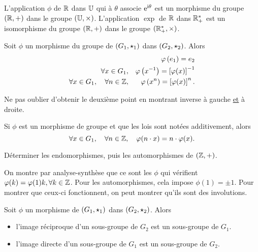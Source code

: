 \documentclass{magnolia}
\begin{document}
\begin{remarqueUnique}
\remarque L'application $\phi$ de $\mathbb{R}$ dans $\U$ qui à $\theta$ associe
  ${\rm e}^{{\rm i}\theta}$ est un morphisme du groupe $(\mathbb{R},+)$ dans le groupe $(\U,\times)$.
  L'application $\exp$ de $\mathbb{R}$ dans $\mathbb{R}_+^*$ est un isomorphisme du
  groupe $(\mathbb{R},+)$ dans le groupe $(\mathbb{R}_+^*,\times)$. 
\end{remarqueUnique}


\begin{proposition}
Soit $\phi$ un morphisme du groupe de $\left(G_1,\star_1\right)$ dans $\left(G_2,\star_2\right)$.
Alors
\begin{eqnarray*}
& & \varphi\left(e_1\right)=e_2\\
\forall x\in G_1, & & \varphi\left(x^{-1}\right)=\left[\varphi(x)\right]^{-1} \\
\forall x\in G_1 ,\quad \forall n\in\mathbb{Z}, & & \varphi\left(x^n\right)=\left[\varphi(x)\right]^n.
\end{eqnarray*}
\end{proposition}

\begin{preuve}
Ne pas oublier d'obtenir le deuxième point en montrant inverse à gauche \underline{et} à droite.
\end{preuve}

\begin{remarqueUnique}
\remarque Si $\phi$ est un morphisme de groupe et que les lois sont notées additivement, alors
  \[\forall x\in G_1,\quad \forall n\in\mathbb{Z},\quad \varphi(n\cdot x)=n\cdot\varphi(x).\]
\end{remarqueUnique}

\begin{exoUnique}
\exo Déterminer les endomorphismes, puis les automorphismes de $(\mathbb{Z},+)$.
\begin{sol}
On montre par analyse-synthèse que ce sont les $\phi$ qui vérifient $\varphi(k)=\varphi(1)k, \forall k \in \mathbb{Z}$. Pour les automorphismes, cela impose $\phi(1)=\pm 1$. Pour montrer que ceux-ci fonctionnent, on peut montrer qu'ils sont des involutions.
\end{sol}
\end{exoUnique}

\begin{proposition}
Soit $\phi$ un morphisme de $\left(G_1,\star_1\right)$ dans $\left(G_2,\star_2\right)$. Alors
\begin{itemize}
\item l'image réciproque d'un sous-groupe de $G_2$ est un sous-groupe de $G_1$.
\item l'image directe d'un sous-groupe de $G_1$ est un sous-groupe de $G_2$.
\end{itemize}
\end{proposition}
\end{document}
